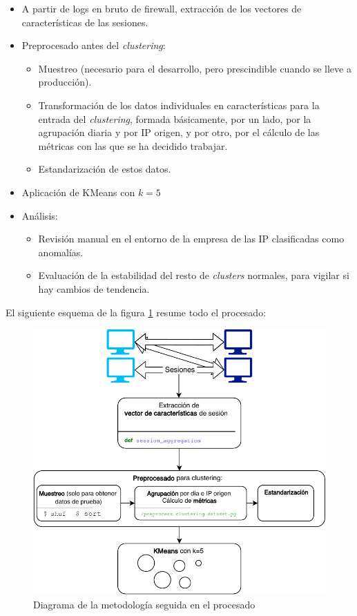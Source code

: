 \begin{itemize}

\item A partir de logs en bruto de firewall, extracción de los vectores de características de las sesiones.

\item Preprocesado antes del \emph{clustering}:

    \begin{itemize}

        \item Muestreo (necesario para el desarrollo, pero prescindible cuando se lleve a producción).

        \item Transformación de los datos individuales en características para la entrada del \emph{clustering},
            formada básicamente, por un lado, por la agrupación diaria y por IP origen, y por otro, por el cálculo de las métricas con las que se ha decidido trabajar.

        \item Estandarización de estos datos.

    \end{itemize}

\item Aplicación de KMeans con $k=5$

\item Análisis:

    \begin{itemize}

        \item Revisión manual en el entorno de la empresa de las IP clasificadas como anomalías.

        \item Evaluación de la estabilidad del resto de \emph{clusters} normales, para vigilar si hay cambios de tendencia.

    \end{itemize}

\end{itemize}

El siguiente esquema de la figura \ref{fig:esquema} resume todo el procesado:

\begin{figure}[h]
    \centering
    \includegraphics{../figures/esquema.pdf}
    \caption{Diagrama de la metodología seguida en el procesado}
    \label{fig:esquema}
\end{figure}
